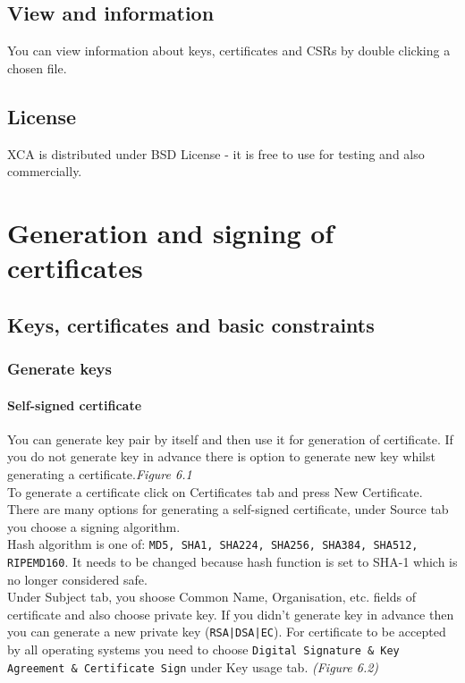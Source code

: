 \documentclass[10pt, a4paper]{report}
\begin{document}
  \subsection{View and information}
You can view information about keys, certificates and CSRs by double clicking a chosen file.
  \subsection{License}
XCA is distributed under BSD License - it is free to use for testing and also commercially.
  
\section{Generation and signing of certificates}

  \subsection{Keys, certificates and basic constraints}
  
    \subsubsection{Generate keys}
    
      \paragraph{Self-signed certificate}
You can generate key pair by itself and then use it for generation of certificate. If you do not generate key in advance there is option to generate new key whilst generating a certificate.\textit{{Figure 6.1}}  \\


To generate a certificate click on Certificates tab and press New Certificate. There are many options for generating a self-signed certificate, under Source tab you choose a signing algorithm.  \\


Hash algorithm is one of: \verb+MD5, SHA1, SHA224, SHA256, SHA384, SHA512, RIPEMD160+. It needs to be changed because hash function is set to SHA-1 which is no longer considered safe.  \\


Under Subject tab, you shoose Common Name, Organisation, etc. fields of certificate and also choose private key. If you didn't generate key in advance then you can generate a new private key (\verb+RSA|DSA|EC+). For certificate to be accepted by all operating systems you need to choose \verb+Digital Signature & Key Agreement & Certificate Sign+ under Key usage tab. \textit{(Figure 6.2)}
\end{document}
